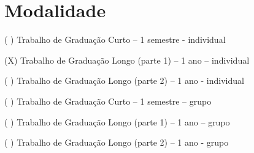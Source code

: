 \chapter{Modalidade}

\begin{description}
	\item (  ) Trabalho de Graduação Curto – 1 semestre - individual
	\item (X) Trabalho de Graduação Longo (parte 1) – 1 ano – individual
	\item (  ) Trabalho de Graduação Longo (parte 2) – 1 ano - individual			
	\item (  ) Trabalho de Graduação Curto – 1 semestre – grupo
	\item (  ) Trabalho de Graduação Longo (parte 1) – 1 ano – grupo
	\item (  ) Trabalho de Graduação Longo (parte 2) – 1 ano - grupo
\end{description}

